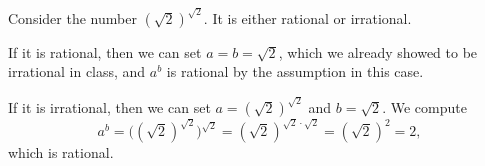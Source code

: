 \proof Consider the number $(\sqrt 2)^{\sqrt 2}$. It is either rational or irrational.

If it is rational, then we can set $a = b = \sqrt 2$, which we already showed to be irrational in class,
and $a^b$ is rational by the assumption in this case.

If it is irrational, then we can set $a =(\sqrt 2)^{\sqrt 2}$ and $b=\sqrt 2$. We compute
$$a^b = \bigl((\sqrt 2)^{\sqrt 2}\bigr)^{\sqrt 2} = (\sqrt 2)^{\sqrt 2 \cdot \sqrt 2}
= (\sqrt 2)^2 = 2,$$
which is rational.\slug

% 

\bye
